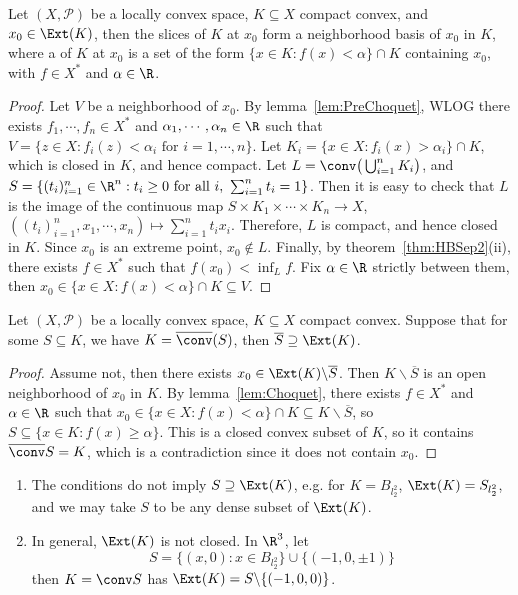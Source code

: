 \documentclass[a4paper]{article}
\begin{document}
\begin{nlemma}\label{lem:Choquet}
  Let $(X,\mathcal{P})$ be a locally convex space, $K\subseteq X$ compact convex, and $x_0\in\Ext(K)$, then the slices of $K$ at $x_0$ form a neighborhood basis of $x_0$ in $K$, where a  of $K$ at $x_0$ is a set of the form $\{x\in K:f(x)<\alpha\}\cap K$ containing $x_0$, with $f\in X^*$ and $\alpha\in\R$.
\end{nlemma}

\begin{proof}
  Let $V$ be a neighborhood of $x_0$. By lemma~\ref{lem:PreChoquet}, WLOG there exists $f_1,\cdots,f_n\in X^*$ and $\alpha_1,\cdots,\alpha_n\in\R$ such that $V=\{z\in X:f_i(z)<\alpha_i\text{ for }i=1,\cdots,n\}$. Let $K_i=\{x\in X:f_i(x)>\alpha_i\}\cap K$, which is closed in $K$, and hence compact. Let $L=\conv\big(\bigcup_{i=1}^n K_i\big)$, and $S=\{(t_i)_{i=1}^n\in\R^n:t_i\geq 0\text{ for all }i,\ \sum_{i=1}^n t_i=1\}$. Then it is easy to check that $L$ is the image of the continuous map $S\times K_1\times\cdots\times K_n\to X$, $((t_i)_{i=1}^n,x_1,\cdots,x_n)\mapsto\sum_{i=1}^n t_ix_i$. Therefore, $L$ is compact, and hence closed in $K$. Since $x_0$ is an extreme point, $x_0\notin L$. Finally, by theorem~\ref{thm:HBSep2}(ii), there exists $f\in X^*$ such that $f(x_0)<\inf_L f$. Fix $\alpha\in\R$ strictly between them, then $x_0\in\{x\in X:f(x)<\alpha\}\cap K\subseteq V$.
\end{proof}

\begin{nthm}\label{thm:KMConverse}
Let $(X,\mathcal{P})$ be a locally convex space, $K\subseteq X$ compact convex. Suppose that for some $S\subseteq K$, we have $K=\overline{\conv}(S)$, then $\overline{S}\supseteq\Ext(K)$.
\end{nthm}

\begin{proof}
  Assume not, then there exists $x_0\in\Ext(K)\backslash\overline{S}$. Then $K\backslash\overline{S}$ is an open neighborhood of $x_0$ in $K$. By lemma~\ref{lem:Choquet}, there exists $f\in X^*$ and $\alpha\in\R$ such that $x_0\in\{x\in X:f(x)<\alpha\}\cap K\subseteq K\backslash\overline{S}$, so $S\subseteq\{x\in K:f(x)\geq\alpha\}$. This is a closed convex subset of $K$, so it contains $\overline{\conv} S=K$, which is a contradiction since it does not contain $x_0$.
\end{proof}

\begin{remark}
	\begin{enumerate}[label=(\arabic*)]
		\item The conditions do not imply $S\supseteq\Ext(K)$, e.g. for $K=B_{l_2^2}$, $\Ext(K)=S_{l_2^2}$, and we may take $S$ to be any dense subset of $\Ext(K)$.
		\item In general, $\Ext(K)$ is not closed. In $\R^3$, let
		\[S=\{(x,0):x\in B_{l_2^2}\}\cup\{(-1,0,\pm 1)\}\]
		then $K=\conv S$ has $\Ext(K)=S\backslash\{(-1,0,0)\}$.
	\end{enumerate}
\end{remark}
\end{document}
